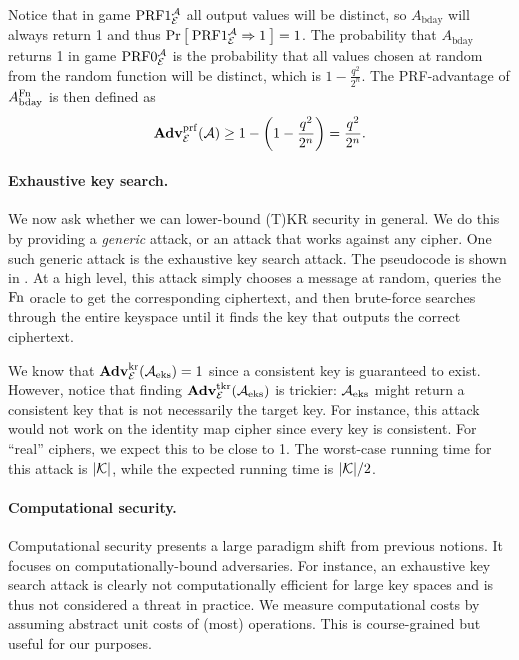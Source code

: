 Notice that in game $\textnormal{PRF}1_{{\cal E}}^{\mathcal A}$ all output values will be distinct, so $A_{\text{bday}}$ will always return 1 and thus $\Pr\left[\: \textnormal{PRF}1_{\cal E}^{\mathcal A}\Rightarrow 1 \:\right]=1$. The probability that $A_{\text{bday}}$ returns 1 in game $\textnormal{PRF}0_{{\cal E}}^{\mathcal A}$ is the probability that all values chosen at random from the random function will be distinct, which is $1 - \frac{q^2}{2^n}$. The PRF-advantage of $A^{\textnormal{Fn}}_{\text{bday}}$ is then defined as 
\begin{equation*}
\mathbf{Adv}^{\mathrm{prf}}_{{\cal E}}({\mathcal A}) \geq 1 - \left(1 - \frac{q^2}{2^n}\right) = \frac{q^2}{2^n}.
\end{equation*}


\paragraph{Exhaustive key search.} We now ask whether we can lower-bound (T)KR security in general. We do this by providing a \textit{generic} attack, or an attack that works against any cipher. One such generic attack is the exhaustive key search attack. The pseudocode is shown in . At a high level, this attack simply chooses a message at random, queries the $\textnormal{Fn}$ oracle to get the corresponding ciphertext, and then brute-force searches through the entire keyspace until it finds the key that outputs the correct ciphertext.  

We know that $\mathbf{Adv}^{\mathrm{kr}}_{{\cal E}}({\mathcal A}_{\textnormal{eks}}) = 1$ since a consistent key is guaranteed to exist. However, notice that finding $\mathbf{Adv}^{\mathrm{tkr}}_{{\cal E}}({\mathcal A}_{\textnormal{eks}})$ is trickier: ${\mathcal A}_{\textnormal{eks}}$ might return a consistent key that is not necessarily the target key. For instance, this attack would not work on the identity map cipher since every key is consistent. For ``real'' ciphers, we expect this to be close to 1. 
The worst-case running time for this attack is $|{\cal K}|$, while the expected running time is $|{\cal K}|/2$.

\paragraph{Computational security.} Computational security presents a large paradigm shift from previous notions. It focuses on computationally-bound adversaries. For instance, an exhaustive key search attack is clearly not computationally efficient for large key spaces and is thus not considered a threat in practice. We measure computational costs by assuming abstract unit costs of (most) operations. This is course-grained but useful for our purposes. 


